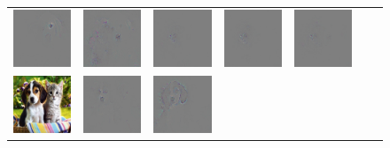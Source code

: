 \begin{figure}
\begin{center}
\begin{tabular}{ccccccc}
\includegraphics[width=0.13\linewidth]{figs/class_compare/googlenet/soft/dog-cat1_diff_163} &
\includegraphics[width=0.13\linewidth]{figs/class_compare/googlenet/soft/dog-cat1_diff_188} &
\includegraphics[width=0.13\linewidth]{figs/class_compare/googlenet/soft/dog-cat1_diff_279} &
\includegraphics[width=0.13\linewidth]{figs/class_compare/googlenet/soft/dog-cat1_diff_293} &
\includegraphics[width=0.13\linewidth]{figs/class_compare/googlenet/soft/dog-cat1_diff_10} \\
\includegraphics[width=0.13\linewidth]{figs/class_compare/googlenet/soft/dog-cat2} &
\includegraphics[width=0.13\linewidth]{figs/class_compare/googlenet/soft/dog-cat2_diff_258} &
\includegraphics[width=0.13\linewidth]{figs/class_compare/googlenet/soft/dog-cat2_diff_163} &

\end{tabular}
\end{center}
\end{figure}
